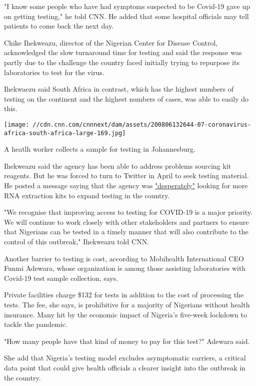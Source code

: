 "I know some people who have had symptoms suspected to be Covid-19 gave
up on getting testing," he told CNN. He added that some hospital
officials may tell patients to come back the next day.

Chike Ihekweazu, director of the Nigerian Center for Disease Control,
acknowledged the slow turnaround time for testing and said the response
was partly due to the challenge the country faced initially trying to
repurpose its laboratories to test for the virus.

Ihekwaezu said South Africa in contrast, which has the highest numbers
of testing on the continent and the highest numbers of cases, was able
to easily do this.

\texttt{[image: //cdn.cnn.com/cnnnext/dam/assets/200806132644-07-coronavirus-africa-south-africa-large-169.jpg]}

A heatlh worker collects a sample for testing in Johannesburg.

Ihekweazu said the agency has been able to address problems sourcing kit
reagents. But he was forced to turn to Twitter in April to seek testing
material. He posted a message saying that the agency was
\href{https://punchng.com/coronavirus-nigeria-desperately-looking-for-test-kits-says-ncdc/}{"desperately"}
looking for more RNA extraction kits to expand testing in the country.

"We recognise that improving access to testing for COVID-19 is a major
priority. We will continue to work closely with other stakeholders and
partners to ensure that Nigerians can be tested in a timely manner that
will also contribute to the control of this outbreak," Ihekweazu told
CNN.

Another barrier to testing is cost, according to Mobihealth
International CEO Funmi Adewara, whose organization is among those
assisting laboratories with Covid-19 test sample collection, says.

Private facilities charge \$132 for tests in addition to the cost of
processing the tests. The fee, she says, is prohibitive for a majority
of Nigerians without health insurance. Many hit by the economic impact
of Nigeria's five-week lockdown to tackle the pandemic.

"How many people have that kind of money to pay for this test?" Adewara
said.

She add that Nigeria's testing model excludes asymptomatic carriers, a
critical data point that could give health officials a clearer insight
into the outbreak in the country.

